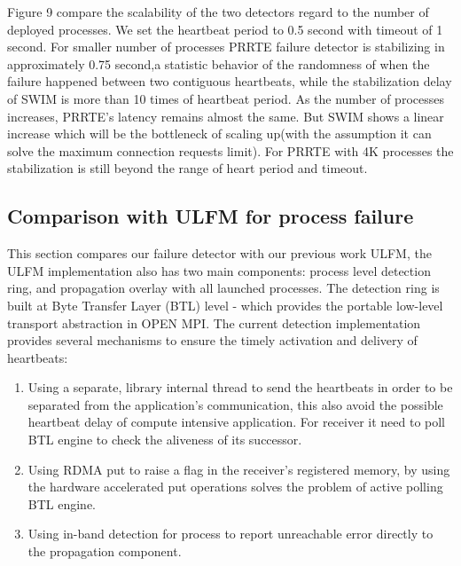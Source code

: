 \documentclass[sigconf]{acmart}
\begin{document}
Figure 9 compare the scalability of the two detectors regard to the number of deployed processes. We set the heartbeat period to 0.5 second with timeout of 1 second. For smaller number of processes PRRTE failure detector is stabilizing in approximately 0.75 second,a statistic behavior of the randomness of when the failure happened between two contiguous heartbeats, while the stabilization delay of SWIM is more than 10 times of heartbeat period. As the number of processes increases, PRRTE's latency remains almost the same. But SWIM shows a linear increase which will be the bottleneck of scaling up(with the assumption it can solve the maximum connection requests limit). For PRRTE with 4K processes the stabilization is still beyond the range of heart period and timeout.

\subsection{Comparison with ULFM for process failure}
This section compares our failure detector with our previous work ULFM\cite{George16}, the ULFM implementation also has two main components: process level detection ring, and propagation overlay with all launched processes. The detection ring is built at Byte Transfer Layer (BTL) level - which provides the portable low-level transport abstraction in OPEN MPI. The current detection implementation provides several mechanisms to ensure the timely activation and delivery of heartbeats:
\begin{enumerate}
  \item Using a separate, library internal thread to send the heartbeats in order to be separated from the application's communication, this also avoid the possible heartbeat delay of compute intensive application. For receiver it need to poll BTL engine to check the aliveness of its successor. 
  \item Using RDMA put to raise a flag in the receiver's registered memory, by using the hardware accelerated put operations solves the problem of active polling BTL engine. 
  \item Using in-band detection for process to report unreachable error directly to the propagation component.
\end{enumerate}
\end{document}
